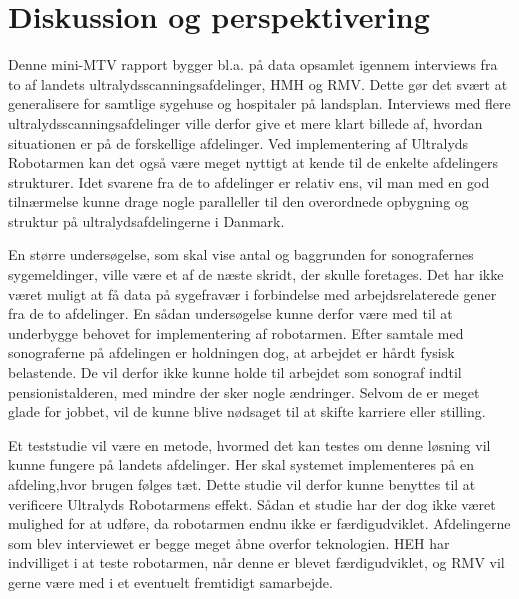 \chapter{Diskussion og perspektivering}

Denne mini-MTV rapport bygger bl.a. på data opsamlet igennem interviews fra to af landets ultralydsscanningsafdelinger, HMH og RMV. Dette gør det svært at generalisere for samtlige sygehuse og hospitaler på landsplan. Interviews med flere ultralydsscanningsafdelinger ville derfor give et mere klart billede af, hvordan situationen er på de forskellige afdelinger. Ved implementering af Ultralyds Robotarmen kan det også være meget nyttigt at kende til de enkelte afdelingers strukturer. 
Idet svarene fra de to afdelinger er relativ ens, vil man med en god tilnærmelse kunne drage nogle paralleller til den overordnede opbygning og struktur på ultralydsafdelingerne i Danmark.

En større undersøgelse, som skal vise antal og baggrunden for sonografernes sygemeldinger, ville være et af de næste skridt, der skulle foretages. Det har ikke været muligt at få data på sygefravær i forbindelse med arbejdsrelaterede gener fra de to afdelinger. En sådan undersøgelse kunne derfor være med til at underbygge behovet for implementering af robotarmen.
Efter samtale med sonograferne på afdelingen er holdningen dog, at arbejdet er hårdt fysisk belastende.  De vil derfor ikke kunne holde til arbejdet som sonograf indtil pensionistalderen, med mindre der sker nogle ændringer. Selvom de er meget glade for jobbet, vil de kunne blive nødsaget til at skifte karriere eller stilling. 


Et teststudie vil være en metode, hvormed det kan testes om denne løsning vil kunne fungere på landets afdelinger. Her skal systemet implementeres på en afdeling,hvor brugen følges tæt. Dette studie vil derfor kunne benyttes til at verificere Ultralyds Robotarmens effekt. Sådan et studie har der dog ikke været mulighed for at udføre, da robotarmen endnu ikke er færdigudviklet. 
Afdelingerne som blev interviewet er begge meget åbne overfor teknologien. HEH har indvilliget i at teste robotarmen, når denne er blevet færdigudviklet, og RMV vil gerne være med i et eventuelt fremtidigt samarbejde. 


